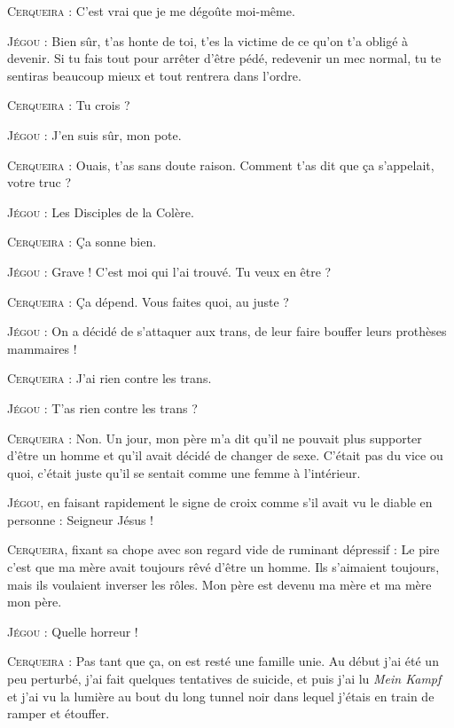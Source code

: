 \begin{dialogue}
\textsc{Cerqueira} : C’est vrai que je me dégoûte moi-même.

\textsc{Jégou} : Bien sûr, t’as honte de toi, t’es la victime de ce qu’on t’a obligé à devenir. Si tu fais tout pour arrêter d’être pédé, redevenir un mec normal, tu te sentiras beaucoup mieux et tout rentrera dans l’ordre.

\textsc{Cerqueira} : Tu crois ?

\textsc{Jégou} : J’en suis sûr, mon pote.

\textsc{Cerqueira} : Ouais, t’as sans doute raison. Comment t’as dit que ça s’appelait, votre truc ?

\textsc{Jégou} : Les Disciples de la Colère.

\textsc{Cerqueira} : Ça sonne bien.

\textsc{Jégou} : Grave ! C’est moi qui l’ai trouvé. Tu veux en être ?

\textsc{Cerqueira} : Ça dépend. Vous faites quoi, au juste ?

\textsc{Jégou} : On a décidé de s’attaquer aux trans, de leur faire bouffer leurs prothèses mammaires !

\textsc{Cerqueira} : J’ai rien contre les trans.

\textsc{Jégou} : T’as rien contre les trans ?

\textsc{Cerqueira} : Non. Un jour, mon père m’a dit qu’il ne pouvait plus supporter d’être un homme et qu’il avait décidé de changer de sexe. C’était pas du vice ou quoi, c’était juste qu’il se sentait comme une femme à l’intérieur.

\textsc{Jégou}, en faisant rapidement le signe de croix comme s’il avait vu le diable en personne : Seigneur Jésus !

\textsc{Cerqueira}, fixant sa chope avec son regard vide de ruminant dépressif : Le pire c’est que ma mère avait toujours rêvé d’être un homme. Ils s’aimaient toujours, mais ils voulaient inverser les rôles. Mon père est devenu ma mère et ma mère mon père.

\textsc{Jégou} : Quelle horreur !

\textsc{Cerqueira} : Pas tant que ça, on est resté une famille unie. Au début j’ai été un peu perturbé, j’ai fait quelques tentatives de suicide, et puis j’ai lu \textit{Mein Kampf} et j’ai vu la lumière au bout du long tunnel noir dans lequel j’étais en train de ramper et étouffer.


\end{dialogue}
